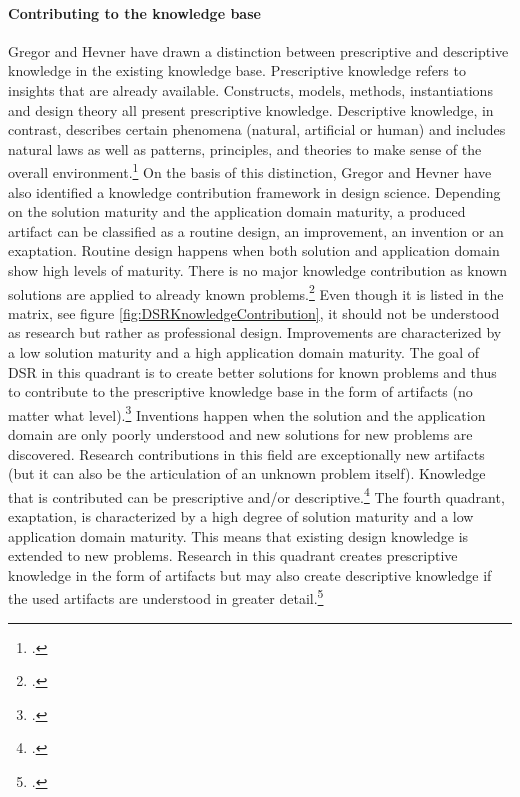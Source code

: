\paragraph{Contributing to the knowledge base} Gregor and Hevner have drawn a distinction between prescriptive and descriptive knowledge in the existing knowledge base. Prescriptive knowledge refers to insights that are already available. Constructs, models, methods, instantiations and design theory all present prescriptive knowledge. Descriptive knowledge, in contrast, describes certain phenomena (natural, artificial or human) and includes natural laws as well as patterns, principles, and theories to make sense of the overall environment.\footcite[Cf.][p.344]{GregorPositioningpresentingdesign2013} On the basis of this distinction, Gregor and Hevner have also identified a knowledge contribution framework in design science. Depending on the solution maturity and the application domain maturity, a produced artifact can be classified as a routine design, an improvement, an invention or an exaptation. Routine design happens when both solution and application domain show high levels of maturity. There is no major knowledge contribution as known solutions are applied to already known problems.\footcite[Cf.][p.348]{GregorPositioningpresentingdesign2013} Even though it is listed in the matrix, see figure \ref{fig:DSRKnowledgeContribution}, it should not be understood as research but rather as professional design. Improvements are characterized by a low solution maturity and a high application domain maturity. The goal of DSR in this quadrant is to create better solutions for known problems and thus to contribute to the prescriptive knowledge base in the form of artifacts (no matter what level).\footcite[Cf.][p.346]{GregorPositioningpresentingdesign2013} Inventions happen when the solution and the application domain are only poorly understood and new solutions for new problems are discovered. Research contributions in this field are exceptionally new artifacts (but it can also be the articulation of an unknown problem itself). Knowledge that is contributed can be prescriptive and/or descriptive.\footcite[Cf.][pp.345,346]{GregorPositioningpresentingdesign2013} The fourth quadrant, exaptation, is characterized by a high degree of solution maturity and a low application domain maturity. This means that existing design knowledge is extended to new problems. Research in this quadrant creates prescriptive knowledge in the form of artifacts but may also create descriptive knowledge if the used artifacts are understood in greater detail.\footcite[Cf.][p.347]{GregorPositioningpresentingdesign2013}

